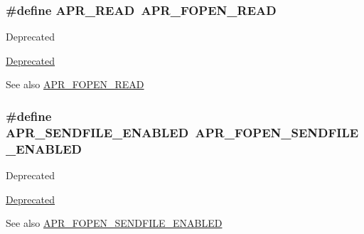 \subsubsection[{\texorpdfstring{A\+P\+R\+\_\+\+R\+E\+AD}{APR_READ}}]{\setlength{\rightskip}{0pt plus 5cm}\#define A\+P\+R\+\_\+\+R\+E\+AD~{\bf A\+P\+R\+\_\+\+F\+O\+P\+E\+N\+\_\+\+R\+E\+AD}}\hypertarget{group__apr__file__open__flags_ga0021db78d799d1c8825b701c7efee483}{}\label{group__apr__file__open__flags_ga0021db78d799d1c8825b701c7efee483}
\begin{DoxyRefDesc}{Deprecated}
\item[\hyperlink{deprecated__deprecated000017}{Deprecated}]\end{DoxyRefDesc}
\begin{DoxySeeAlso}{See also}
\hyperlink{group__apr__file__open__flags_gaf9e7303f028b130ff7d4b209d6662d7d}{A\+P\+R\+\_\+\+F\+O\+P\+E\+N\+\_\+\+R\+E\+AD} 
\end{DoxySeeAlso}
\subsubsection[{\texorpdfstring{A\+P\+R\+\_\+\+S\+E\+N\+D\+F\+I\+L\+E\+\_\+\+E\+N\+A\+B\+L\+ED}{APR_SENDFILE_ENABLED}}]{\setlength{\rightskip}{0pt plus 5cm}\#define A\+P\+R\+\_\+\+S\+E\+N\+D\+F\+I\+L\+E\+\_\+\+E\+N\+A\+B\+L\+ED~{\bf A\+P\+R\+\_\+\+F\+O\+P\+E\+N\+\_\+\+S\+E\+N\+D\+F\+I\+L\+E\+\_\+\+E\+N\+A\+B\+L\+ED}}\hypertarget{group__apr__file__open__flags_ga17e216aadb23254580258889e10c53f3}{}\label{group__apr__file__open__flags_ga17e216aadb23254580258889e10c53f3}
\begin{DoxyRefDesc}{Deprecated}
\item[\hyperlink{deprecated__deprecated000029}{Deprecated}]\end{DoxyRefDesc}
\begin{DoxySeeAlso}{See also}
\hyperlink{group__apr__file__open__flags_ga60c21e28e4a612d58a874fe2cc71a6e4}{A\+P\+R\+\_\+\+F\+O\+P\+E\+N\+\_\+\+S\+E\+N\+D\+F\+I\+L\+E\+\_\+\+E\+N\+A\+B\+L\+ED} 
\end{DoxySeeAlso}
